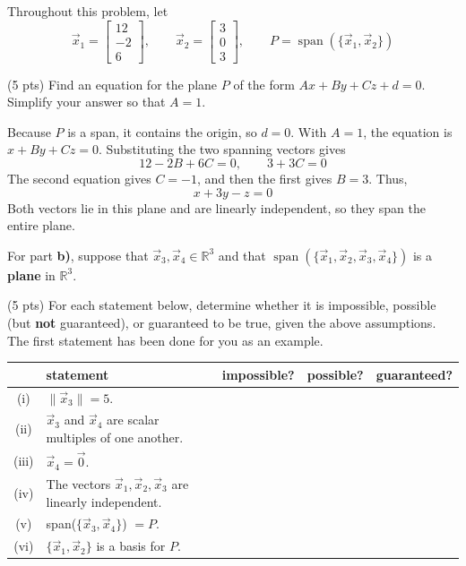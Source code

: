 \documentclass[11pt,twoside]{article}
\begin{document}
\begin{prob}[(19 pts)]
Throughout this problem, let
\[
\vec x_1=\begin{bmatrix}12\\-2\\6\end{bmatrix},\qquad
\vec x_2=\begin{bmatrix}3\\0\\3\end{bmatrix},\qquad
P=\operatorname{span}(\{\vec x_1,\vec x_2\})
\]
\begin{subprob}(5 pts) Find an equation for the plane $P$ of the form $Ax+By+Cz+d=0$. Simplify your answer so that $A=1$.
\par\medskip
\noindent


\begin{solution}
Because $P$ is a span, it contains the origin, so $d=0$. With $A=1$, the equation is $x+By+Cz=0$. Substituting the two spanning vectors gives
\[
12-2B+6C=0,\qquad 3+3C=0
\]
The second equation gives $C=-1$, and then the first gives $B=3$. Thus,
\[
\boxed{x+3y-z=0}
\]
Both vectors lie in this plane and are linearly independent, so they span the entire plane.
\end{solution}
\end{subprob}

\newpage
For part \textbf{b)}, suppose that $\vec x_3,\vec x_4\in\mathbb R^3$ and that $\operatorname{span}(\{\vec x_1,\vec x_2,\vec x_3,\vec x_4\})$ is a \textbf{plane} in $\mathbb R^3$.

\begin{subprob}(5 pts) For each statement below, determine whether it is impossible, possible (but \textbf{not} guaranteed), or guaranteed to be true, given the above assumptions. The first statement has been done for you as an example.
\begin{center}
\renewcommand{\arraystretch}{1.4}
\setlength{\tabcolsep}{3pt}
\begin{tabular}{|c|p{8.2cm}|c|c|c|}
\hline
 & \textbf{statement} & \textbf{impossible?} & \textbf{possible?} & \textbf{guaranteed?} \\
\hline
(i) & $\lVert \vec x_3 \rVert = 5$. & \bubble{} & \filledbubble{} & \bubble{} \\
(ii) & $\vec x_3$ and $\vec x_4$ are scalar multiples of one another.& \bubble{} & \correctbubble{} & \bubble{} \\
(iii) & $\vec x_4 = \vec 0$. & \bubble{} & \correctbubble{} & \bubble{} \\
(iv) & The vectors $\vec x_1, \vec x_2, \vec x_3$ are linearly independent. & \correctbubble{} & \bubble{} & \bubble{} \\
(v) & span($\{\vec x_3, \vec x_4\}$) $ = P$. & \bubble{} & \correctbubble{} & \bubble{} \\
(vi) & $\{\vec x_1, \vec x_2\}$ is a basis for $P$. & \bubble{} & \bubble{} & \correctbubble{} \\
\hline
\end{tabular}
\end{center}


\end{subprob}
\end{prob}
\end{document}
